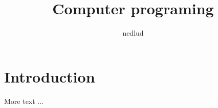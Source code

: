 \documentclass[a4paper,twoside]{scrbook}
\def\inputtex#1{}
\begin{document}
\title{Computer programing}
\author{nedlud}
\frontmatter
\maketitle
\tableofcontents
\mainmatter
\chapter{Introduction}
More text ...
\inputtex{chem-chapter.tex}
\end{document}
